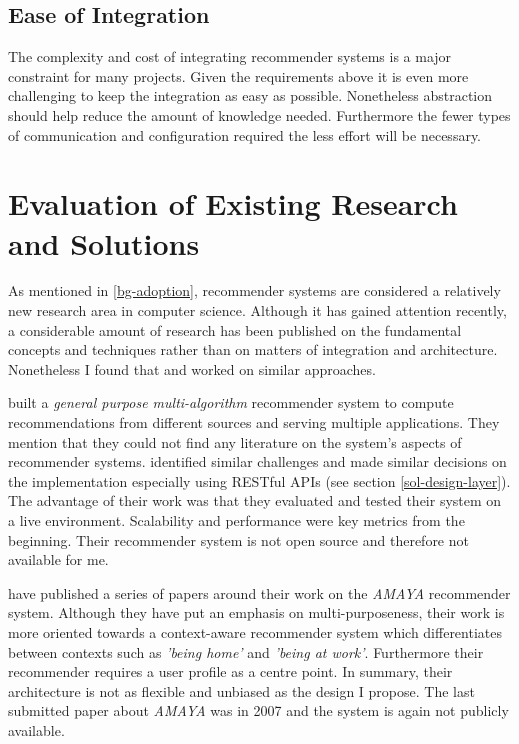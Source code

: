 \subsection{Ease of Integration}

The complexity and cost of integrating recommender systems is a major constraint for many projects. Given the requirements above it is even more challenging to keep the integration as easy as possible. Nonetheless abstraction should help reduce the amount of knowledge needed. Furthermore the fewer types of communication and configuration required the less effort will be necessary.



\section{Evaluation of Existing Research and Solutions}
\label{prob-evaluation}

As mentioned in \ref{bg-adoption}, recommender systems are considered a relatively new research area in computer science. Although it has gained attention recently, a considerable amount of research has been published on the fundamental concepts and techniques rather than on matters of integration and architecture. Nonetheless I found that \citet{cortizo10} and \citet{rack07} worked on similar approaches.

\citet{cortizo10} built a \textit{general purpose multi-algorithm} recommender system to compute recommendations from different sources and serving multiple applications. They mention that they could not find any literature on the system's aspects of recommender systems. \citet{cortizo10} identified similar challenges and made similar decisions on the implementation especially using RESTful APIs (see section \ref{sol-design-layer}). The advantage of their work was that they evaluated and tested their system on a live environment. Scalability and performance were key metrics from the beginning. Their recommender system is not open source and therefore not available for me.

\citet{rack07} have published a series of papers around their work on the \emph{AMAYA} recommender system. Although they have put an emphasis on multi-purposeness, their work is more oriented towards a context-aware recommender system which differentiates between contexts such as \emph{'being home'} and \emph{'being at work'}. Furthermore their recommender requires a user profile as a centre point. In summary, their architecture is not as flexible and unbiased as the design I propose. The last submitted paper about \emph{AMAYA} was in 2007 and the system is again not publicly available.

